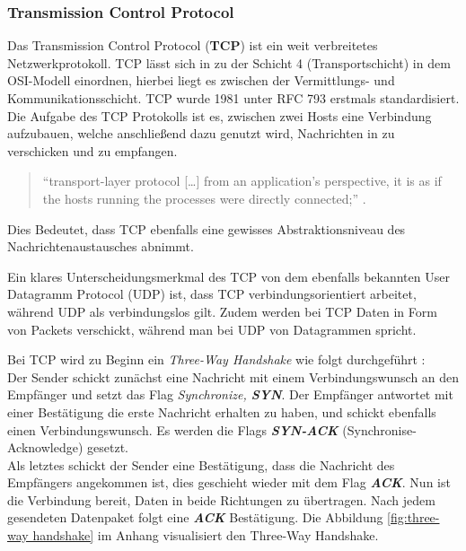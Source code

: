 \documentclass[paper=a4,fontsize=12pt,ngerman]{scrartcl}
\begin{document}
\subsubsection{Transmission Control Protocol}

Das Transmission Control Protocol (\textbf{TCP}) ist ein weit verbreitetes Netzwerkprotokoll. 
TCP lässt sich in zu der Schicht 4 (Transportschicht) in dem OSI-Modell einordnen, hierbei liegt es zwischen der Vermittlungs- und Kommunikationsschicht.
\newline TCP wurde 1981 unter RFC 793 erstmals standardisiert. \cite{rfc793}  \newline
Die Aufgabe des TCP Protokolls ist es, zwischen zwei Hosts eine Verbindung aufzubauen, welche anschließend dazu genutzt wird,  
Nachrichten in zu verschicken und zu empfangen.

\begin{quote}
``transport-layer protocol [\dots] from an application’s perspective, it is as if 
the hosts running the processes were directly connected;'' \cite[241]{kr22}.      
\end{quote}


Dies Bedeutet, dass TCP ebenfalls eine gewisses Abstraktionsniveau
des Nachrichtenaustausches abnimmt. 


Ein klares Unterscheidungsmerkmal des TCP von dem ebenfalls bekannten User Datagramm Protocol (UDP) ist, dass TCP verbindungsorientiert arbeitet, 
während UDP als verbindungslos gilt. Zudem werden bei TCP Daten in Form von Packets verschickt, während man bei UDP von Datagrammen spricht. \newline

Bei TCP wird zu Beginn ein \textit{Three-Way Handshake}
wie folgt durchgeführt : \\
Der Sender schickt zunächst eine Nachricht mit einem Verbindungswunsch an den Empfänger und setzt das Flag 
\textit{Synchronize, \textbf{SYN}}.
\newline
Der Empfänger antwortet mit einer Bestätigung die erste Nachricht erhalten zu haben, und schickt ebenfalls einen 
Verbindungswunsch. Es werden die Flags \textit{\textbf{SYN-ACK}} (Synchronise-Acknowledge) gesetzt.\\
Als letztes schickt der Sender eine Bestätigung, dass die Nachricht des Empfängers angekommen ist, dies geschieht wieder
mit dem Flag \textit{\textbf{ACK}}. Nun ist die Verbindung bereit, Daten in beide Richtungen zu übertragen.
Nach jedem gesendeten Datenpaket folgt eine \textit{\textbf{ACK}} Bestätigung.
\newline Die Abbildung \ref{fig:three-way handshake} im Anhang visualisiert den Three-Way Handshake.
\end{document}
